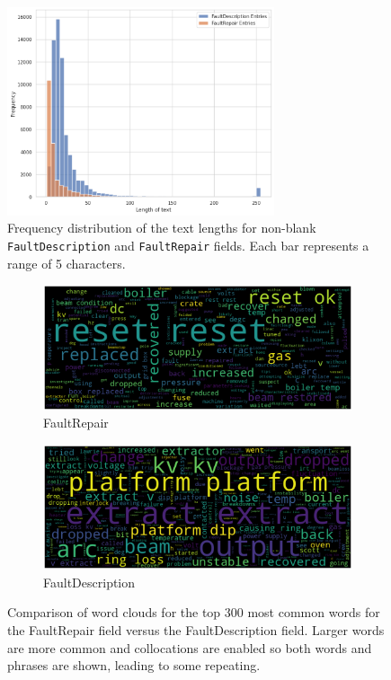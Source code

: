 \documentclass[10pt,oneside]{report}
\begin{document}
\begin{figure}[htbp]
    \centering
    \includegraphics[width=0.7\textwidth]{FaultDescriptionVSFaultRepairs.png}
    \caption{Frequency distribution of the text lengths for non-blank \texttt{FaultDescription} and \texttt{FaultRepair} fields. Each bar represents a range of 5 characters.}\label{fig:FaultDescriptionVSFaultRepairs}
\end{figure}

\begin{figure}[htbp]
    \centering
    \begin{subfigure}[b]{0.48\textwidth}
        \centering
        \includegraphics[width=\textwidth]{wcFaultRepairs.png}
        \caption{FaultRepair}
        \label{fig:wcFaultRepairs}
    \end{subfigure}%
    \hfill
    \begin{subfigure}[b]{0.48\textwidth}
        \centering
        \includegraphics[width=\textwidth]{wcFaultDescription.png}
        \caption{FaultDescription}
        \label{fig:wcFaultDescription}
    \end{subfigure}
    \caption{Comparison of word clouds for the top 300 most common words for the FaultRepair field versus the FaultDescription field. Larger words are more common and collocations are enabled so both words and phrases are shown, leading to some repeating.}
    \label{fig:wc}
\end{figure}
\end{document}
